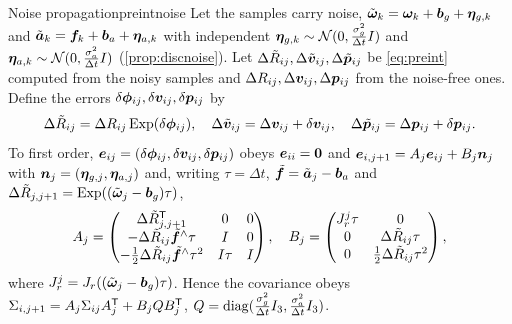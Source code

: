 \begin{proposition}{Noise propagation}{preintnoise}
Let the samples carry noise, $\tilde{\bm{\omega}}_k=\bm{\omega}_k+\bm{b}_g+
\bm{\eta}_{g,k}$ and $\tilde{\bm{a}}_k=\bm{f}_k+\bm{b}_a+
\bm{\eta}_{a,k}$ with independent $\bm{\eta}_{g,k}\sim\mathcal{N}(0,
\frac{\sigma_g^2}{\Delta t}I)$ and $\bm{\eta}_{a,k}\sim\mathcal{N}(0,
\frac{\sigma_a^2}{\Delta t}I)$ (\cref{prop:discnoise}). Let $\Delta
\tilde R_{ij},\Delta\tilde{\bm{v}}_{ij},\Delta\tilde{\bm{p}}_{ij}$ be
\eqref{eq:preint} computed from the noisy samples and $\Delta R_{ij},
\Delta\bm{v}_{ij},\Delta\bm{p}_{ij}$ from the noise-free ones. Define the
errors $\delta\bm{\phi}_{ij},\delta\bm{v}_{ij},\delta\bm{p}_{ij}$ by
\begin{equation}\label{eq:preinterr}
\Delta\tilde R_{ij}=\Delta R_{ij}\operatorname{Exp}(\delta\bm{\phi}_{ij}),\quad
\Delta\tilde{\bm{v}}_{ij}=\Delta\bm{v}_{ij}+\delta\bm{v}_{ij},\quad
\Delta\tilde{\bm{p}}_{ij}=\Delta\bm{p}_{ij}+\delta\bm{p}_{ij}.
\end{equation}
To first order, $\bm{e}_{ij}=(\delta\bm{\phi}_{ij},\delta\bm{v}_{ij},
\delta\bm{p}_{ij})$ obeys $\bm{e}_{ii}=\bm{0}$ and
$\bm{e}_{i,j+1}=A_j\bm{e}_{ij}+B_j\bm{n}_j$ with
$\bm{n}_j=(\bm{\eta}_{g,j},\bm{\eta}_{a,j})$ and, writing $\tau=\Delta
t$, $\tilde{\bm{f}}=\tilde{\bm{a}}_j-\bm{b}_a$ and $\Delta
\tilde R_{j,j+1}=\operatorname{Exp}((\tilde{\bm{\omega}}_j-\bm{b}_g)\tau)$,
\begin{equation}\label{eq:preintAB}
A_j=\begin{pmatrix}\Delta\tilde R_{j,j+1}^{\mathsf{T}}&0&0\\
-\Delta\tilde R_{ij}\tilde{\bm{f}}^{\wedge}\tau&I&0\\
-\frac12\Delta\tilde R_{ij}\tilde{\bm{f}}^{\wedge}\tau^2&I\tau&I
\end{pmatrix},\quad
B_j=\begin{pmatrix}J_r^j\tau&0\\0&\Delta\tilde R_{ij}\tau\\
0&\frac12\Delta\tilde R_{ij}\tau^2\end{pmatrix},
\end{equation}
where $J_r^j=J_r((\tilde{\bm{\omega}}_j-\bm{b}_g)\tau)$. Hence the
covariance obeys $\Sigma_{i,j+1}=A_j\Sigma_{ij}A_j^{\mathsf{T}}+B_jQB_j^{\mathsf{T}}$,
$Q=\operatorname{diag}(\frac{\sigma_g^2}{\Delta t}I_3,\frac{\sigma_a^2}{\Delta t}I_3)$.
\end{proposition}

